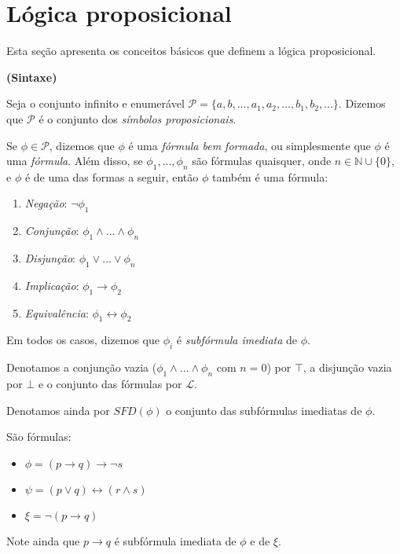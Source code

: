 
\section{Lógica proposicional}

\indent

Esta seção apresenta os conceitos básicos que definem a lógica proposicional.

\begin{definition}\textbf{(Sintaxe)}
	
	Seja o conjunto infinito e enumerável $\mathcal{P} = \{a,b,...,a_1,a_2,...,b_1,b_2,...\}$. Dizemos que $\mathcal{P}$ é o conjunto dos \emph{símbolos proposicionais}.
	
    Se $\phi \in \mathcal{P}$, dizemos que $\phi$ é uma \emph{fórmula bem formada}, ou simplesmente que $\phi$ é uma \emph{fórmula}. Além disso, se $\phi_1,...,\phi_n$ são fórmulas quaisquer, onde $n \in \mathbb{N} \cup \{0\}$, e $\phi$ é de uma das formas a seguir, então $\phi$ também é uma fórmula:
    \begin{enumerate}
        \item \emph{Negação}: $\neg \phi_1$
        \item \emph{Conjunção}: $\phi_1 \wedge ... \wedge \phi_n$
        \item \emph{Disjunção}: $\phi_1 \vee ... \vee \phi_n$
        \item \emph{Implicação}: $\phi_1 \rightarrow \phi_2$
        \item \emph{Equivalência}: $\phi_1 \leftrightarrow \phi_2$
    \end{enumerate}
    Em todos os casos, dizemos que $\phi_i$ é \emph{subfórmula imediata} de $\phi$.
    
    Denotamos a conjunção vazia ($\phi_1 \wedge ... \wedge \phi_n$ com $n=0$) por $\top$, a disjunção vazia por $\bot$ e o conjunto das fórmulas por $\mathcal{L}$.
    
    Denotamos ainda por $SFD(\phi)$ o conjunto das subfórmulas imediatas de $\phi$.
\end{definition}

\begin{example}
	São fórmulas:
	\begin{itemize}
		\item $\phi = (p \rightarrow q) \rightarrow \neg s$
		\item $\psi = (p \vee q) \leftrightarrow (r \wedge s)$
		\item $\xi  = \neg(p \rightarrow q)$
	\end{itemize}
	
	Note ainda que $p \rightarrow q$ é subfórmula imediata de $\phi$ e de $\xi$.
\end{example}


